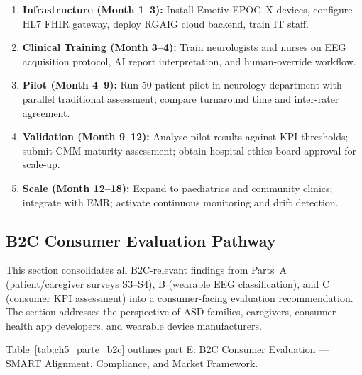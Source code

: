 \begin{enumerate}[label=\textbf{Stage \arabic*:}, leftmargin=2.5cm]
    \item \textbf{Infrastructure (Month 1--3):} Install Emotiv EPOC~X devices, configure HL7 FHIR gateway, deploy RGAIG cloud backend, train IT staff.
    \item \textbf{Clinical Training (Month 3--4):} Train neurologists and nurses on EEG acquisition protocol, AI report interpretation, and human-override workflow.
    \item \textbf{Pilot (Month 4--9):} Run 50-patient pilot in neurology department with parallel traditional assessment; compare turnaround time and inter-rater agreement.
    \item \textbf{Validation (Month 9--12):} Analyse pilot results against KPI thresholds; submit CMM maturity assessment; obtain hospital ethics board approval for scale-up.
    \item \textbf{Scale (Month 12--18):} Expand to paediatrics and community clinics; integrate with EMR; activate continuous monitoring and drift detection.
\end{enumerate}

\iffalse %
\subsection{B2C Consumer Evaluation Pathway}
\label{sec:ch5_part_e_b2c}

This section consolidates all B2C-relevant findings from Parts~A (patient/caregiver surveys S3--S4), B (wearable EEG classification), and C (consumer KPI assessment) into a consumer-facing evaluation recommendation. The section addresses the perspective of ASD families, caregivers, consumer health app developers, and wearable device manufacturers.

\noindent Table~\ref{tab:ch5_parte_b2c} outlines part E: B2C Consumer Evaluation --- SMART Alignment, Compliance, and Market Framework.

